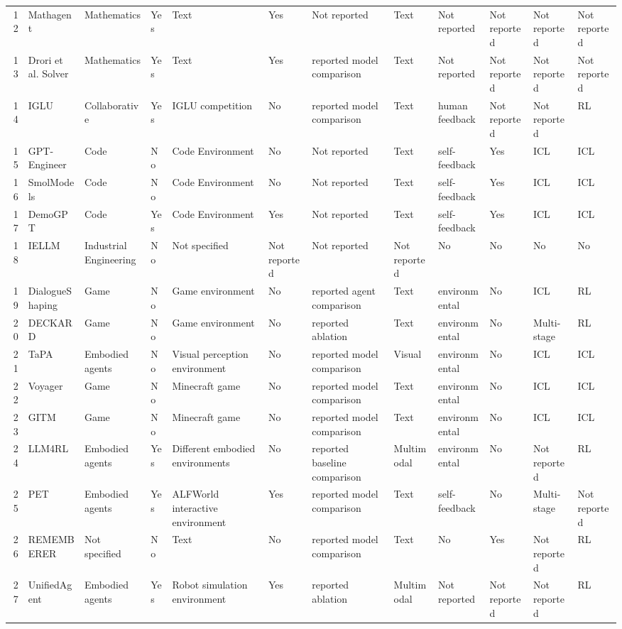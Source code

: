 \begin{table}
{\begin{tabular}{rlllllllllll}
12&Mathagent\cite{swan2023math}&Mathematics&Yes&Text&Yes&Not reported&Text&Not reported&Not reported&Not reported&Not reported\\
13&Drori et al. Solver\cite{drori2022neural}&Mathematics&Yes&Text&Yes&{reported model comparison}&Text&Not reported&Not reported&Not reported&Not reported\\
14&IGLU\cite{mehta2023improving}&Collaborative&Yes&IGLU competition&No&{reported model comparison}&Text&human feedback&Not reported&Not reported&RL\\
15&GPT-Engineer\cite{gptengineer2023}&Code&No&Code Environment&No&Not reported&Text&self-feedback&Yes&ICL&ICL\\
16&SmolModels\cite{smoldev2023}&Code&No&Code Environment&No&Not reported&Text&self-feedback&Yes&ICL&ICL\\
17&DemoGPT\cite{demogpt2023}&Code&{Yes}&Code Environment&{Yes}&Not reported&Text&self-feedback&Yes&ICL&ICL\\
18&IELLM\cite{ogundare2023industrial}&Industrial Engineering&No&Not specified&Not reported&Not reported&Not reported&No&No&No&No\\
19&DialogueShaping\cite{zhou2023dialogue}&Game&No&Game environment&No&{reported agent comparison}&Text&environmental&No&ICL&RL\\
20&DECKARD\cite{nottingham2023embodied}&Game&No&Game environment&No&reported ablation&Text&environmental&No&Multi-stage&RL\\
21&TaPA\cite{wu2023embodied}&Embodied agents&No&Visual perception environment&No&{reported model comparison}&Visual&environmental&No&ICL&ICL\\
22&Voyager\cite{wang2023voyager}&Game&No&Minecraft game&No&{reported model comparison}&Text&environmental&No&ICL&ICL\\
23&GITM\cite{zhu2023ghost}&Game&No&Minecraft game&No&{reported model comparison}&Text&environmental&No&ICL&ICL\\
24&LLM4RL\cite{huenabling}&Embodied agents&Yes&Different embodied environments&No&{reported baseline comparison}&Multimodal&environmental&No&Not reported&RL\\
25&PET\cite{wu2023plan}&Embodied agents&Yes&ALFWorld interactive environment&Yes&{reported model comparison}&Text&self-feedback&No&Multi-stage&Not reported\\
26&REMEMBERER\cite{zhang2023large}&Not specified&No&Text&No&{reported model comparison}&Text&No&Yes&Not reported&RL\\
27&UnifiedAgent\cite{di2023towards}&Embodied agents&Yes&Robot simulation environment&Yes&reported ablation&Multimodal&Not reported&Not reported&Not reported&RL\\

\end{tabular}}
\end{table}
